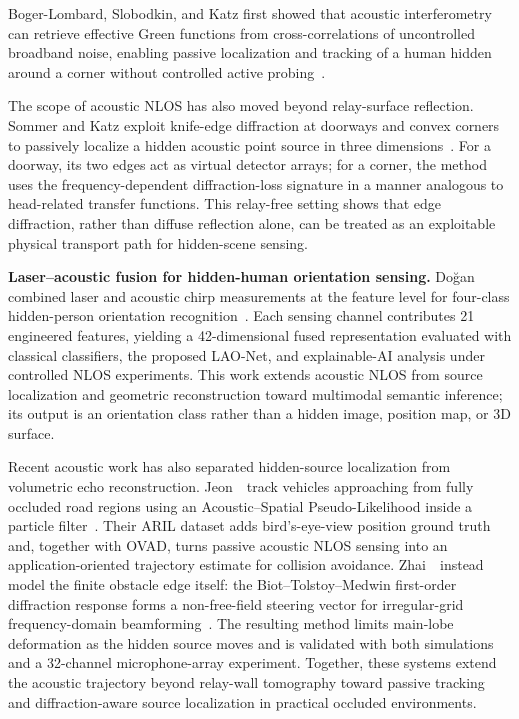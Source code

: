 Boger-Lombard, Slobodkin, and Katz first showed that acoustic interferometry can retrieve effective Green functions from cross-correlations of uncontrolled broadband noise, enabling passive localization and tracking of a human hidden around a corner without controlled active probing~\cite{bogerLombardPassiveAcousticCorners2023}.

The scope of acoustic NLOS has also moved beyond relay-surface reflection. Sommer and Katz exploit knife-edge diffraction at doorways and convex corners to passively localize a hidden acoustic point source in three dimensions~\cite{sommerPassiveAcousticNLOS2026}. For a doorway, its two edges act as virtual detector arrays; for a corner, the method uses the frequency-dependent diffraction-loss signature in a manner analogous to head-related transfer functions. This relay-free setting shows that edge diffraction, rather than diffuse reflection alone, can be treated as an exploitable physical transport path for hidden-scene sensing.

\vspace{0.8mm}
\noindent \textbf{Laser--acoustic fusion for hidden-human orientation sensing.}
Do{\u{g}}an combined laser and acoustic chirp measurements at the feature level for four-class hidden-person orientation recognition~\cite{doganLaserAcousticOrientationNLOS2026}. Each sensing channel contributes 21 engineered features, yielding a 42-dimensional fused representation evaluated with classical classifiers, the proposed LAO-Net, and explainable-AI analysis under controlled NLOS experiments. This work extends acoustic NLOS from source localization and geometric reconstruction toward multimodal semantic inference; its output is an orientation class rather than a hidden image, position map, or 3D surface.

Recent acoustic work has also separated hidden-source localization from volumetric echo reconstruction. Jeon~\etal~track vehicles approaching from fully occluded road regions using an Acoustic--Spatial Pseudo-Likelihood inside a particle filter~\cite{jeonSoundVehicleNLOS2025}. Their ARIL dataset adds bird's-eye-view position ground truth and, together with OVAD, turns passive acoustic NLOS sensing into an application-oriented trajectory estimate for collision avoidance. Zhai~\etal~instead model the finite obstacle edge itself: the Biot--Tolstoy--Medwin first-order diffraction response forms a non-free-field steering vector for irregular-grid frequency-domain beamforming~\cite{zhaiIrregularGridAcousticNLOS2025}. The resulting method limits main-lobe deformation as the hidden source moves and is validated with both simulations and a 32-channel microphone-array experiment. Together, these systems extend the acoustic trajectory beyond relay-wall tomography toward passive tracking and diffraction-aware source localization in practical occluded environments.

